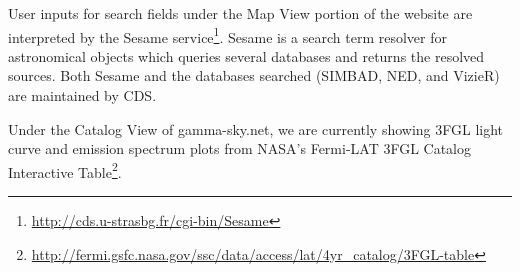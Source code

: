 User inputs for search fields under the Map View portion of the website are interpreted by the Sesame service\footnote[3]{\url{http://cds.u-strasbg.fr/cgi-bin/Sesame}}. Sesame is a search term resolver for astronomical objects which queries several databases and returns the resolved sources. Both Sesame and the databases searched (SIMBAD, NED, and VizieR) are maintained by CDS.

Under the Catalog View of gamma-sky.net, we are currently showing 3FGL light curve and emission spectrum plots from NASA's Fermi-LAT 3FGL Catalog Interactive Table\footnote[4]{\url{http://fermi.gsfc.nasa.gov/ssc/data/access/lat/4yr_catalog/3FGL-table}}.
